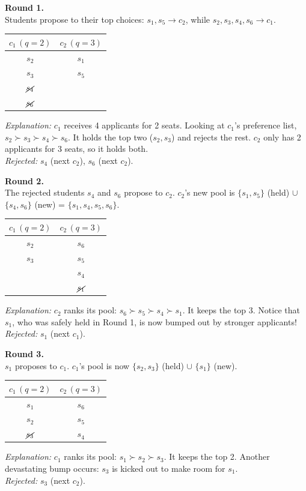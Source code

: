 {\medskip
\noindent\textbf{Round 1.} \\
Students propose to their top choices: $s_1, s_5 \to c_2$, while $s_2, s_3, s_4, s_6 \to c_1$.
\begin{center}
\renewcommand{\arraystretch}{1.2}
\begin{tabular}{cc}
    $c_1\, (q=2)$ & $c_2\, (q=3)$ \\
    \hline
    $s_2$ & $s_1$ \\
    $s_3$ & $s_5$ \\
    $\cancel{s_4}$ & \\
    $\cancel{s_6}$ & \\
\end{tabular}
\end{center}
\textit{Explanation:} $c_1$ receives 4 applicants for 2 seats. Looking at $c_1$'s preference list, $s_2 \succ s_3 \succ s_4 \succ s_6$. It holds the top two ($s_2, s_3$) and rejects the rest. $c_2$ only has 2 applicants for 3 seats, so it holds both. \\
\textit{Rejected:} $s_4$ (next $c_2$), $s_6$ (next $c_2$).

\medskip
\noindent\textbf{Round 2.} \\
The rejected students $s_4$ and $s_6$ propose to $c_2$. $c_2$'s new pool is $\{s_1, s_5\}$ (held) $\cup$ $\{s_4, s_6\}$ (new) = $\{s_1, s_4, s_5, s_6\}$.
\begin{center}
\renewcommand{\arraystretch}{1.2}
\begin{tabular}{cc}
    $c_1\, (q = 2 )$ & $c_2 \,(q = 3)$ \\
    \hline
    $s_2$ & $s_6$ \\
    $s_3$ & $s_5$ \\
          & $s_4$ \\
          & $\cancel{s_1}$ \\
\end{tabular}
\end{center}
\textit{Explanation:} $c_2$ ranks its pool: $s_6 \succ s_5 \succ s_4 \succ s_1$. It keeps the top 3. Notice that $s_1$, who was safely held in Round 1, is now bumped out by stronger applicants! \\
\textit{Rejected:} $s_1$ (next $c_1$).

\medskip
\noindent\textbf{Round 3.} \\
$s_1$ proposes to $c_1$. $c_1$'s pool is now $\{s_2, s_3\}$ (held) $\cup$ $\{s_1\}$ (new). 
\begin{center}
\renewcommand{\arraystretch}{1.2}
\begin{tabular}{cc}
    $c_1\, (q = 2 )$ & $c_2 \,(q = 3)$ \\
    \hline
    $s_1$ & $s_6$ \\
    $s_2$ & $s_5$ \\
    $\cancel{s_3}$ & $s_4$ \\
\end{tabular}
\end{center}
\textit{Explanation:} $c_1$ ranks its pool: $s_1 \succ s_2 \succ s_3$. It keeps the top 2. Another devastating bump occurs: $s_3$ is kicked out to make room for $s_1$. \\
\textit{Rejected:} $s_3$ (next $c_2$).

}
